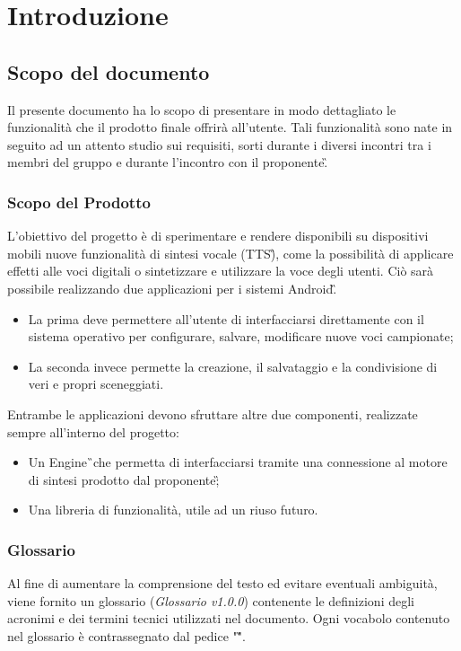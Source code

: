 \section{Introduzione}

\subsection{Scopo del documento}
Il presente documento ha lo scopo di presentare in modo dettagliato le funzionalità che il prodotto finale offrirà all'utente. Tali funzionalità sono nate in seguito ad un attento studio sui requisiti, sorti durante i diversi incontri tra i membri del gruppo e durante l'incontro con il proponente\G. 

\subsubsection{Scopo del Prodotto}
L'obiettivo del progetto è di sperimentare e rendere disponibili su dispositivi 
mobili nuove funzionalità di sintesi vocale (TTS\G), come la possibilità di 
applicare effetti alle voci digitali o sintetizzare e utilizzare la voce degli 
utenti.
Ciò sarà possibile realizzando due applicazioni per i sistemi Android\G.
\begin{itemize}
\item La prima deve permettere all'utente di interfacciarsi direttamente con il sistema operativo per configurare, salvare, modificare nuove voci campionate;
\item La seconda invece permette la creazione, il salvataggio e la condivisione di veri e propri sceneggiati.
\end{itemize}
Entrambe le applicazioni devono sfruttare altre due componenti, realizzate sempre all'interno del progetto:
\begin{itemize}
\item Un Engine\G\ che permetta di interfacciarsi tramite una connessione al motore di sintesi prodotto dal proponente\G;
\item Una libreria di funzionalità, utile ad un riuso futuro.
\end{itemize} 

\subsubsection{Glossario}
Al fine di aumentare la comprensione del testo ed evitare eventuali ambiguità, 
viene fornito un glossario (\textit{Glossario v1.0.0}) contenente le 
definizioni degli acronimi e dei termini tecnici utilizzati nel documento. Ogni 
vocabolo contenuto nel glossario è contrassegnato dal pedice "\G ".

